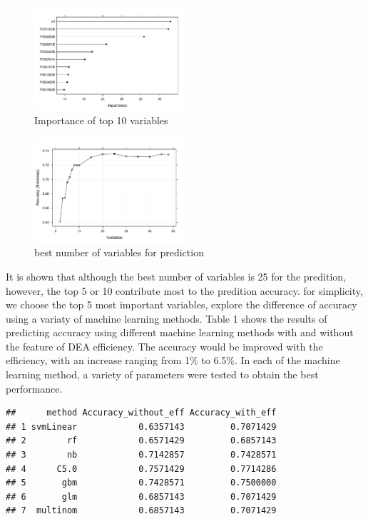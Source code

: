 \documentclass[]{article}
\begin{document}

\begin{figure}[htbp]
\centering
\includegraphics[width = 0.5\textwidth]{article_files/figure-latex/plot_variable_importance-2.pdf}
\caption{Importance of top 10 variables}\label{varimp}
\end{figure}


\begin{figure}[htbp]
\centering
\includegraphics[width = 0.5\textwidth]{article_files/figure-latex/plot_feature_selection-1.pdf}
\caption{best number of variables for prediction}\label{feature_selection}
\end{figure}
It is shown that although the best number of  variables is 25 for the predition, however, the top 5 or 10 contribute most to the predition accuracy. for simplicity, we choose the top
5 most important variables, explore the difference of accuracy using
a variaty of machine learning methods.
Table 1 shows the results of predicting accuracy using different machine learning methods with and without the feature of DEA efficiency. The accuracy would be improved with the efficiency, with an increase ranging from 1\% to 6.5\%. In each of the machine learning method, a variety of parameters were tested to obtain the best performance. 
\begin{verbatim}
##      method Accuracy_without_eff Accuracy_with_eff
## 1 svmLinear            0.6357143         0.7071429
## 2        rf            0.6571429         0.6857143
## 3        nb            0.7142857         0.7428571
## 4      C5.0            0.7571429         0.7714286
## 5       gbm            0.7428571         0.7500000
## 6       glm            0.6857143         0.7071429
## 7  multinom            0.6857143         0.7071429
\end{verbatim}
\end{document}
